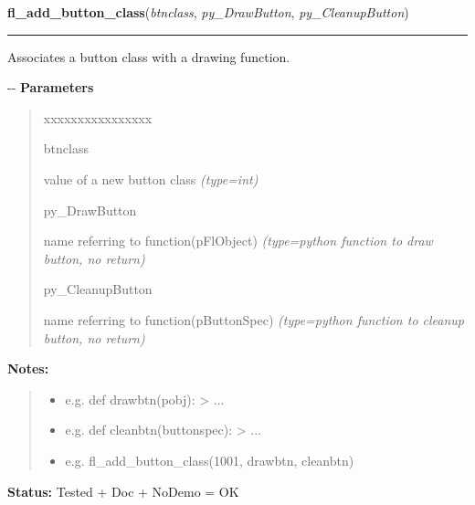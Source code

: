 \hspace{.8\funcindent}\begin{boxedminipage}{\funcwidth}

    \raggedright \textbf{fl\_add\_button\_class}(\textit{btnclass}, \textit{py\_DrawButton}, \textit{py\_CleanupButton})

    \vspace{-1.5ex}

    \rule{\textwidth}{0.5\fboxrule}
\setlength{\parskip}{2ex}

Associates a button class with a drawing function.

-{}-
\setlength{\parskip}{1ex}
      \textbf{Parameters}
      \vspace{-1ex}

      \begin{quote}
        \begin{Ventry}{xxxxxxxxxxxxxxxx}

          \item[btnclass]


value of a new button class
            {\it (type=int)}

          \item[py\_DrawButton]


name referring to function(pFlObject)
            {\it (type=python function to draw button, no return)}

          \item[py\_CleanupButton]


name referring to function(pButtonSpec)
            {\it (type=python function to cleanup button, no return)}

        \end{Ventry}

      \end{quote}

\textbf{Notes:}
\begin{quote}
  \begin{itemize}

  \item
    \setlength{\parskip}{0.6ex}

e.g. def drawbtn(pobj): > ...


  \item 
e.g. def cleanbtn(buttonspec): > ...


  \item 
e.g. fl\_add\_button\_class(1001, drawbtn, cleanbtn)


\end{itemize}

\end{quote}

\textbf{Status:} 
Tested + Doc + NoDemo = OK


    \end{boxedminipage}

